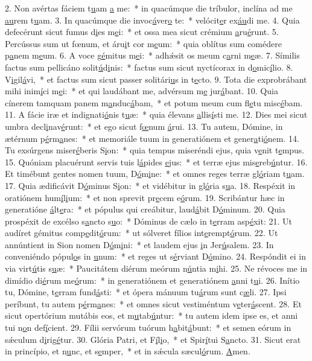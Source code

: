 2. Non avértas fáciem t\uline{u}am \uline{a} me:~* in quacúmque die tríbulor, inclína ad me \uline{au}rem t\uline{u}am.
3. In quacúmque die invoc\uline{á}ver\uline{o} te:~* velócit\uline{e}r ex\uline{áu}di me.
4. Quia defecérunt sicut fumus d\uline{i}es m\uline{e}i:~* et ossa mea sicut crémium \uline{a}ru\uline{é}runt.
5. Percússus sum ut fœnum, et áru\uline{i}t cor m\uline{e}um:~* quia oblítus sum comédere p\uline{a}nem m\uline{e}um.
6. A voce g\uline{é}mitus m\uline{e}i:~* adhǽsit os meum c\uline{a}rni m\uline{e}æ.
7. Símilis factus sum pellicáno solit\uline{ú}d\uline{i}nis:~* factus sum sicut nyctícorax in d\uline{o}mic\uline{í}lio.
8. V\uline{i}gil\uline{á}vi,~* et factus sum sicut passer solitári\uline{u}s in t\uline{e}cto.
9. Tota die exprobrábant mihi inim\uline{í}ci m\uline{e}i:~* et qui laudábant me, advérsum m\uline{e} jur\uline{á}bant.
10. Quia cínerem tamquam panem m\uline{a}nduc\uline{á}bam,~* et potum meum cum fl\uline{e}tu misc\uline{é}bam.
11. A fácie iræ et indignati\uline{ó}nis t\uline{u}æ:~* quia élevans \uline{a}llis\uline{í}sti me.
12. Dies mei sicut umbra decl\uline{i}nav\uline{é}runt:~* et ego sicut f\uline{œ}num \uline{á}rui.
13. Tu autem, Dómine, in ætérnum p\uline{é}rm\uline{a}nes:~* et memoriále tuum in generatiónem et gener\uline{a}ti\uline{ó}nem.
14. Tu exsúrgens miser\uline{é}beris S\uline{i}on:~* quia tempus miseréndi ejus, quia v\uline{e}nit t\uline{e}mpus.
15. Quóniam placuérunt servis tuis l\uline{á}pides \uline{e}jus:~* et terræ ejus mis\uline{e}reb\uline{ú}ntur.
16. Et timébunt gentes nomen tuum, D\uline{ó}m\uline{i}ne:~* et omnes reges terræ gl\uline{ó}riam t\uline{u}am.
17. Quia ædificávit D\uline{ó}minus S\uline{i}on:~* et vidébitur in gl\uline{ó}ria s\uline{u}a.
18. Respéxit in oratiónem hum\uline{í}l\uline{i}um:~* et non sprevit pr\uline{e}cem e\uline{ó}rum.
19. Scribántur hæc in generatióne \uline{á}lt\uline{e}ra:~* et pópulus qui creábitur, laud\uline{á}bit D\uline{ó}minum.
20. Quia prospéxit de excélso s\uline{a}ncto s\uline{u}o:~* Dóminus de cælo in t\uline{e}rram asp\uline{é}xit:
21. Ut audíret gémitus comp\uline{e}dit\uline{ó}rum:~* ut sólveret fílios int\uline{e}rempt\uline{ó}rum.
22. Ut annúntient in Sion nomen D\uline{ó}m\uline{i}ni:~* et laudem ejus \uline{i}n Jer\uline{ú}salem.
23. In conveniéndo pópul\uline{o}s in \uline{u}num:~* et reges ut s\uline{é}rviant D\uline{ó}mino.
24. Respóndit ei in via virt\uline{ú}tis s\uline{u}æ:~* Paucitátem diérum meórum n\uline{ú}ntia m\uline{i}hi.
25. Ne révoces me in dimídio di\uline{é}rum me\uline{ó}rum:~* in generatiónem et generatiónem \uline{a}nni t\uline{u}i.
26. Inítio tu, Dómine, t\uline{e}rram fund\uline{á}sti:~* et ópera mánuum tu\uline{á}rum sunt c\uline{æ}li.
27. Ipsi períbunt, tu autem p\uline{é}rm\uline{a}nes:~* et omnes sicut vestiméntum v\uline{e}ter\uline{á}scent.
28. Et sicut opertórium mutábis eos, et m\uline{u}tab\uline{ú}ntur:~* tu autem idem ipse es, et anni tui n\uline{o}n def\uline{í}cient.
29. Fílii servórum tuórum h\uline{a}bit\uline{á}bunt:~* et semen eórum in sǽculum d\uline{i}rig\uline{é}tur.
30. Glória Patri, et F\uline{í}l\uline{i}o,~* et Spir\uline{í}tui S\uline{a}ncto.
31. Sicut erat in princípio, et n\uline{u}nc, et s\uline{e}mper,~* et in sǽcula sæcul\uline{ó}rum. \uline{A}men.
